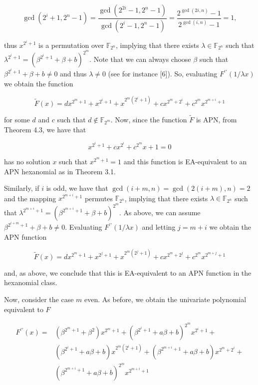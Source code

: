 \documentclass[10pt]{article}
\begin{document}
$$
\operatorname{gcd}\left(2^{i}+1,2^{n}-1\right)=\frac{\operatorname{gcd}\left(2^{2 i}-1,2^{n}-1\right)}{\operatorname{gcd}\left(2^{i}-1,2^{n}-1\right)}=\frac{2^{\operatorname{gcd}(2 i, n)}-1}{2^{\operatorname{gcd}(i, n)}-1}=1,
$$

thus $x^{2^{i}+1}$ is a permutation over $\mathbb{F}_{2^{n}}$, implying that there exists $\lambda \in \mathbb{F}_{2^{n}}$ such that $\lambda^{2^{i}+1}=\left(\beta^{2^{i}+1}+\beta+b\right)^{2^{m}}$. Note that we can always choose $\beta$ such that $\beta^{2^{i}+1}+\beta+b \neq 0$ and thus $\lambda \neq 0$ (see for instance [6]). So, evaluating $F^{\prime \prime}(1 / \lambda x)$ we obtain the function

$$
\tilde{F}(x)=d x^{2^{m}+1}+x^{2^{i}+1}+x^{2^{m}\left(2^{i}+1\right)}+c x^{2^{m}+2^{i}}+c^{2^{m}} x^{2^{m+i}+1}
$$

for some $d$ and $c$ such that $d \notin \mathbb{F}_{2^{m}}$. Now, since the function $\tilde{F}$ is APN, from Theorem 4.3, we have that

$$
x^{2^{i}+1}+c x^{2^{i}}+c^{2^{m}} x+1=0
$$

has no solution $x$ such that $x^{2^{m}+1}=1$ and this function is EA-equivalent to an APN hexanomial as in Theorem 3.1.

Similarly, if $i$ is odd, we have that $\operatorname{gcd}(i+m, n)=\operatorname{gcd}(2(i+m), n)=2$ and the mapping $x^{2^{m+i}+1}$ permutes $\mathbb{F}_{2^{n}}$, implying that there exists $\lambda \in \mathbb{F}_{2^{n}}$ such that $\lambda^{2^{m+i}+1}=\left(\beta^{2^{m+i}+1}+\beta+b\right)^{2^{m}}$. As above, we can assume $\beta^{2^{i+m}+1}+ \beta+b \neq 0$. Evaluating $F^{\prime \prime}(1 / \lambda x)$ and letting $j=m+i$ we obtain the APN function

$$
\tilde{F}(x)=d x^{2^{m}+1}+x^{2^{j}+1}+x^{2^{m}\left(2^{j}+1\right)}+c x^{2^{m}+2^{j}}+c^{2^{m}} x^{2^{m+j}+1}
$$

and, as above, we conclude that this is EA-equivalent to an APN function in the hexanomial class.

Now, consider the case $m$ even. As before, we obtain the univariate polynomial equivalent to $F$

$$
\begin{aligned}
F^{\prime \prime}(x)= & \left(\beta^{2^{m}+1}+\beta^{2}\right) x^{2^{m}+1}+\left(\beta^{2^{i}+1}+a \beta+b\right)^{2^{m}} x^{2^{i}+1}+ \\
& \left(\beta^{2^{i}+1}+a \beta+b\right) x^{2^{m}\left(2^{i}+1\right)}+\left(\beta^{2^{m+i}+1}+a \beta+b\right) x^{2^{m}+2^{i}}+ \\
& \left(\beta^{2^{m+i}+1}+a \beta+b\right)^{2^{m}} x^{2^{m+i}+1}
\end{aligned}
$$
\end{document}
